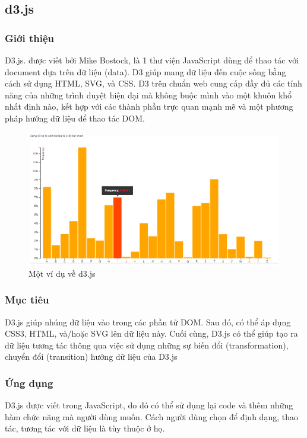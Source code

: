 \documentclass[12pt,a4paper,oneside]{article}
\begin{document}
\subsection{d3.js}
\subsubsection{Giới thiệu}
D3.js\cite{d3jsintro1}. được viết bởi Mike Bostock, là 1 thư viện JavaScript dùng để thao tác với document dựa trên dữ liệu (data). D3 giúp mang dữ liệu đến cuộc sống bằng cách sử dụng HTML, SVG, và CSS. D3 trên chuẩn web cung cấp đầy đủ các tính năng của những trình duyệt hiện đại mà không buộc mình vào một khuôn khổ nhất định nào, kết hợp với các thành phần trực quan mạnh mẽ và một phương pháp hướng dữ liệu để thao tác DOM.

\begin{center}
    \begin{figure}[htp]
    \begin{center}
     \includegraphics[scale=.6]{image/d3}
    \end{center}
    \caption{Một ví dụ về d3.js}
    \label{refhinh14}
    \end{figure}
\end{center}

\subsubsection{Mục tiêu}
D3.js giúp nhúng dữ liệu vào trong các phần tử DOM. Sau đó, có thể áp dụng CSS3, HTML, và/hoặc SVG lên dữ liệu này. Cuối cùng, D3.js có thể giúp tạo ra dữ liệu tương tác thông qua việc sử dụng những sự biến đổi (transformation), chuyển đổi (transition) hướng dữ liệu của D3.js

\subsubsection{Ứng dụng}
D3.js được viết trong JavaScript, do đó có thể sử dụng lại code và thêm những hàm chức năng mà người dùng muốn. Cách người dùng chọn để định dạng, thao tác, tương tác với dữ liệu là tùy thuộc ở họ.\citep{d3jsintro2}
\end{document}
